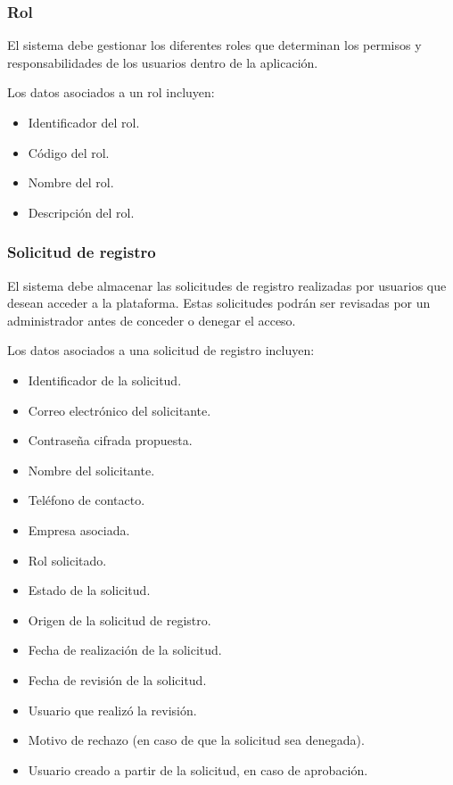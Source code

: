 \subsubsection*{Rol}

El sistema debe gestionar los diferentes roles que determinan los permisos y
responsabilidades de los usuarios dentro de la aplicación.

Los datos asociados a un rol incluyen:

\begin{itemize}
    \item Identificador del rol.
    \item Código del rol.
    \item Nombre del rol.
    \item Descripción del rol.
\end{itemize}

\subsubsection*{Solicitud de registro}

El sistema debe almacenar las solicitudes de registro realizadas por usuarios
que desean acceder a la plataforma. Estas solicitudes podrán ser revisadas por
un administrador antes de conceder o denegar el acceso.

Los datos asociados a una solicitud de registro incluyen:

\begin{itemize}
    \item Identificador de la solicitud.
    \item Correo electrónico del solicitante.
    \item Contraseña cifrada propuesta.
    \item Nombre del solicitante.
    \item Teléfono de contacto.
    \item Empresa asociada.
    \item Rol solicitado.
    \item Estado de la solicitud.
    \item Origen de la solicitud de registro.
    \item Fecha de realización de la solicitud.
    \item Fecha de revisión de la solicitud.
    \item Usuario que realizó la revisión.
    \item Motivo de rechazo (en caso de que la solicitud sea denegada).
    \item Usuario creado a partir de la solicitud, en caso de aprobación.
\end{itemize}

